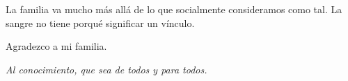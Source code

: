 
\thispagestyle{empty}

\noindent
La familia va mucho más allá de lo que socialmente consideramos como tal. La sangre no tiene porqué significar un vínculo.

\hfill

\noindent
Agradezco a mi familia.

\vspace*{\fill}
\begin{flushright}
\textit{Al conocimiento, que sea de todos y para todos.}
\end{flushright}
